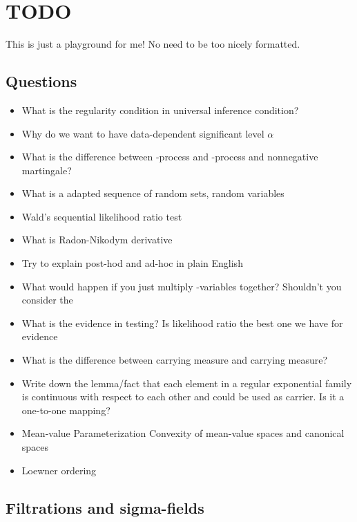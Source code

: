 \newpage

\section{TODO}
This is just a playground for me! No need to be too nicely formatted.

\subsection{Questions}

\begin{itemize}
	\item What is the regularity condition in universal inference condition?
	\item Why do we want to have data-dependent significant level $\alpha$
	\item What is the difference between \p-process and \E-process and nonnegative martingale?
	\item What is a adapted sequence of random sets, random variables
	\item Wald's sequential likelihood ratio test
	\item What is Radon-Nikodym derivative
	\item Try to explain post-hod and ad-hoc in plain English
	\item What would happen if you just multiply \E-variables together? Shouldn't you consider the
	\item What is the evidence in testing? Is likelihood ratio the best one we have for evidence
\end{itemize}

\begin{itemize}
	\item What is the difference between carrying measure and carrying measure?
	\item Write down the lemma/fact that each element in a regular exponential family is continuous
	      with respect to each other and could be used as carrier. Is it a one-to-one mapping?
	\item Mean-value Parameterization Convexity of mean-value spaces and canonical spaces
	\item Loewner ordering
\end{itemize}

\subsection{Filtrations and sigma-fields}

